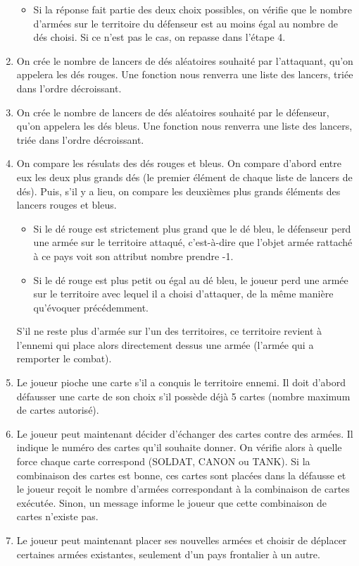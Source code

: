\begin{enumerate}
\begin{itemize}
        \item Si la réponse fait partie des deux choix possibles, on vérifie que le nombre d'armées sur le territoire du défenseur est au moins égal au nombre de dés choisi. Si ce n'est pas le cas, on repasse dans l'étape 4.
    \end{itemize}
    \vspace{0.2cm}
    \item On crée le nombre de lancers de dés aléatoires souhaité par l'attaquant, qu'on appelera les dés rouges. Une fonction nous renverra une liste des lancers, triée dans l'ordre décroissant.
    \vspace{0.2cm}
    \item On crée le nombre de lancers de dés aléatoires souhaité par le défenseur, qu'on appelera les dés bleus. Une fonction nous renverra une liste des lancers, triée dans l'ordre décroissant.
    \vspace{0.2cm}
    \item On compare les résulats des dés rouges et bleus. On compare d'abord entre eux les deux plus grands dés (le premier élément de chaque liste de lancers de dés). Puis, s'il y a lieu, on compare les deuxièmes plus grands éléments des lancers rouges et bleus.
    \begin{itemize}
        \item Si le dé rouge est strictement plus grand que le dé bleu, le défenseur perd une armée sur le territoire attaqué, c'est-à-dire que l'objet armée rattaché à ce pays voit son attribut nombre prendre -1.
        \item Si le dé rouge est plus petit ou égal au dé bleu, le joueur perd une armée sur le territoire avec lequel il a choisi d'attaquer, de la même manière qu'évoquer précédemment.
    \end{itemize}
    S'il ne reste plus d'armée sur l'un des territoires, ce territoire revient à l'ennemi qui place alors directement dessus une armée (l'armée qui a remporter le combat).
    \vspace{0.2cm}
    \item Le joueur pioche une carte s'il a conquis le territoire ennemi. Il doit d'abord défausser une carte de son choix s'il possède déjà 5 cartes (nombre maximum de cartes autorisé).
    \vspace{0.2cm}
    \item Le joueur peut maintenant décider d'échanger des cartes contre des armées. Il indique le numéro des cartes qu'il souhaite donner. On vérifie alors à quelle force chaque carte correspond (SOLDAT, CANON ou TANK). Si la combinaison des cartes est bonne, ces cartes sont placées dans la défausse et le joueur reçoit le nombre d'armées correspondant à la combinaison de cartes exécutée. Sinon, un message informe le joueur que cette combinaison de cartes n'existe pas.
    \vspace{0.2cm}
    \item Le joueur peut maintenant placer ses nouvelles armées et choisir de déplacer certaines armées existantes, seulement d'un pays frontalier à un autre.
    

\end{enumerate}
